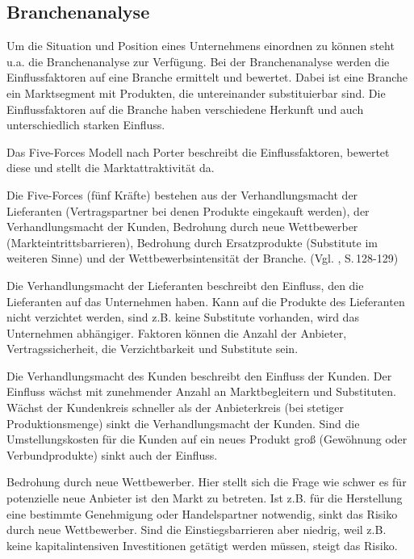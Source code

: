 \subsection{Branchenanalyse} \label{Branchen}
    Um die Situation und Position eines Unternehmens einordnen zu können steht u.a. die Branchenanalyse zur Verfügung.
    Bei der Branchenanalyse werden die Einflussfaktoren auf eine Branche ermittelt und bewertet. Dabei ist eine Branche
    ein Marktsegment mit Produkten, die untereinander substituierbar sind. Die Einflussfaktoren auf die Branche haben
    verschiedene Herkunft und auch unterschiedlich starken Einfluss.

    \noindent
    Das Five-Forces Modell nach Porter beschreibt die Einflussfaktoren, bewertet diese und stellt die Marktattraktivität
    da.

    \noindent
    Die Five-Forces (fünf Kräfte) bestehen aus der Verhandlungsmacht der Lieferanten (Vertragspartner bei denen Produkte
    eingekauft werden), der Verhandlungsmacht der Kunden, Bedrohung durch neue Wettbewerber (Markteintrittsbarrieren),
    Bedrohung durch Ersatzprodukte (Substitute im weiteren Sinne) und der Wettbewerbsintensität der Branche.
    (Vgl. \cite{Gamayanto2005}, S.\,128-129)

    \noindent
    Die Verhandlungsmacht der Lieferanten beschreibt den Einfluss, den die Lieferanten auf das Unternehmen haben. Kann
    auf die Produkte des Lieferanten nicht verzichtet werden, sind z.B. keine Substitute vorhanden, wird das Unternehmen
    abhängiger. Faktoren können die Anzahl der Anbieter, Vertragssicherheit, die Verzichtbarkeit und Substitute sein.

    \noindent
    Die Verhandlungsmacht des Kunden beschreibt den Einfluss der Kunden. Der Einfluss wächst mit zunehmender Anzahl an
    Marktbegleitern und Substituten. Wächst der Kundenkreis schneller als der Anbieterkreis (bei stetiger
    Produktionsmenge) sinkt die Verhandlungsmacht der Kunden. Sind die Umstellungskosten für die Kunden auf ein neues
    Produkt groß (Gewöhnung oder Verbundprodukte) sinkt auch der Einfluss.

    \noindent
    Bedrohung durch neue Wettbewerber. Hier stellt sich die Frage wie schwer es für potenzielle neue Anbieter ist den
    Markt zu betreten. Ist z.B. für die Herstellung eine bestimmte Genehmigung oder Handelspartner notwendig, sinkt das
    Risiko durch neue Wettbewerber. Sind die Einstiegsbarrieren aber niedrig, weil z.B. keine kapitalintensiven
    Investitionen getätigt werden müssen, steigt das Risiko.

